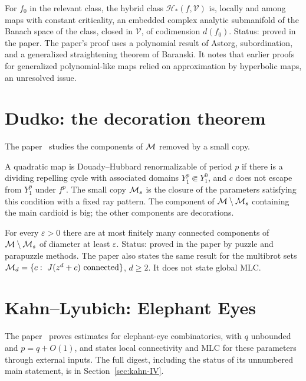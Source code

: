 \begin{theorem}
\label{thm:shen}
For $f_0$ in the relevant class, the hybrid class $\mathcal H_*(f,\mathcal V)$ is,
locally and among maps with constant criticality, an embedded complex analytic
submanifold of the Banach space of the class, closed in $\mathcal V$, of codimension
$d(f_0)$.  Status: proved in the paper.  The paper's proof uses a polynomial
result of Astorg, subordination, and a generalized straightening theorem of
Baranski.  It notes that earlier proofs for generalized polynomial-like maps relied
on approximation by hyperbolic maps, an unresolved issue.
\end{theorem}

\section{Dudko: the decoration theorem}
\label{sec:digest-decoration}

The paper~\cite{DudkoDecoration} studies the components of $\mathcal M$ removed by a small
copy.

\begin{definition}
\label{def:decoration}
A quadratic map is Douady--Hubbard renormalizable of period $p$ if there is a
dividing repelling cycle with associated domains $Y^p_1\Subset Y^0_1$, and $c$ does not
escape from $Y^p_1$ under $f^p$.  The small copy $\mathcal M_s$ is the closure of the
parameters satisfying this condition with a fixed ray pattern.  The component of
$\mathcal M\setminus\mathcal M_s$ containing the main cardioid is big; the other components are
decorations.
\end{definition}

\begin{theorem}
\label{thm:decoration}
For every $\varepsilon>0$ there are at most finitely many connected components of
$\mathcal M\setminus\mathcal M_s$ of diameter at least $\varepsilon$.  Status: proved in the paper
by puzzle and parapuzzle methods.  The paper also states the same result for the
multibrot sets $\mathcal M_d=\{c:\ J(z^d+c)\text{ connected}\}$, $d\ge2$.  It does not
state global MLC.
\end{theorem}

\section{Kahn--Lyubich: Elephant Eyes}
\label{sec:digest-elephant}

The paper~\cite{KahnLyubichElephant} proves estimates for elephant-eye combinatorics, with $q$ unbounded and $p=q+O(1)$,
and states local connectivity and MLC for these parameters through external inputs.  The full digest, including the status of
its unnumbered main statement, is in Section~\ref{sec:kahn-IV}.

